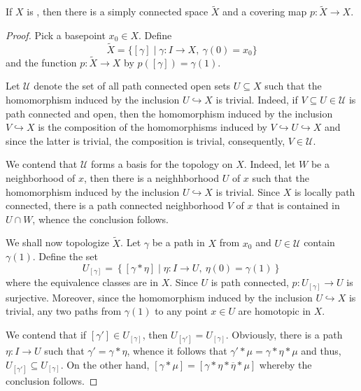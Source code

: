 \begin{theorem}
    If $X$ is \nice, then there is a simply connected space $\widetilde X$ and a covering map $p:\widetilde X\to X$.
\end{theorem}
\begin{proof}
Pick a basepoint $x_0\in X$. Define
\begin{equation*}
    \widetilde X = \{[\gamma]\mid\gamma: I\to X,~\gamma(0) = x_0\}
\end{equation*}
and the function $p:\widetilde X\to X$ by $p([\gamma]) = \gamma(1)$.

Let $\mathscr U$ denote the set of all path connected open sets $U\subseteq X$ such that the homomorphism induced by the inclusion $U\hookrightarrow X$ is trivial. Indeed, if $V\subseteq U\in\mathscr U$ is path connected and open, then the homomorphism induced by the inclusion $V\hookrightarrow X$ is the composition of the homomorphisms induced by $V\hookrightarrow U\hookrightarrow X$ and since the latter is trivial, the composition is trivial, consequently, $V\in\mathscr U$.

We contend that $\mathscr U$ forms a basis for the topology on $X$. Indeed, let $W$ be a neighborhood of $x$, then there is a neighhborhood $U$ of $x$ such that the homomorphism induced by the inclusion $U\hookrightarrow X$ is trivial. Since $X$ is locally path connected, there is a path connected neighborhood $V$ of $x$ that is contained in $U\cap W$, whence the conclusion follows.

We shall now topologize $\widetilde{X}$. Let $\gamma$ be a path in $X$ from $x_0$ and $U\in\mathscr U$ contain $\gamma(1)$. Define the set 
\begin{equation*}
    U_{[\gamma]} = \left\{[\gamma * \eta]\mid \eta: I\to U,~\eta(0) = \gamma(1)\right\}
\end{equation*}
where the equivalence classes are in $X$. Since $U$ is path connected, $p: U_{[\gamma]}\to U$ is surjective. Moreover, since the homomorphism induced by the inclusion $U\hookrightarrow X$ is trivial, any two paths from $\gamma(1)$ to any point $x\in U$ are homotopic in $X$.

We contend that if $[\gamma']\in U_{[\gamma]}$, then $U_{[\gamma']} = U_{[\gamma]}$. Obviously, there is a path $\eta: I\to U$ such that $\gamma' = \gamma * \eta$, whence it follows that $\gamma' * \mu = \gamma * \eta * \mu$ and thus, $U_{[\gamma']}\subseteq U_{[\gamma]}$. On the other hand, $[\gamma * \mu] = [\gamma * \eta * \overline{\eta} * \mu]$ whereby the conclusion follows.


\end{proof}
